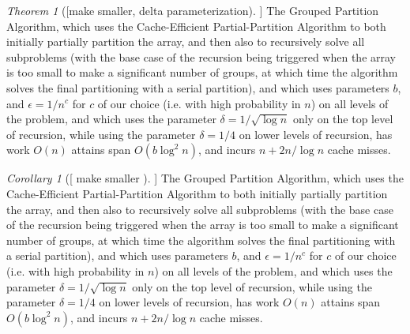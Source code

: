 \documentclass[sigconf]{acmart}
\theoremstyle{remark}
\newtheorem{theorem}{Theorem}[section]
\newtheorem{corollary}[thm]{Corollary}
\theoremstyle{remark}
\begin{document}
\begin{theorem}
	[[make smaller, delta parameterization]]
	The Grouped Partition Algorithm, which uses the Cache-Efficient Partial-Partition Algorithm to both initially partially partition the array, and then also to recursively solve all subproblems (with the base case of the recursion being triggered when the array is too small to make a significant number of groups, at which time the algorithm solves the final partitioning with a serial partition), and which uses parameters $b$, and $\epsilon = 1/n^c$ for $c$ of our choice (i.e. with high probability in $n$) on all levels of the problem, and which uses the parameter $\delta=1/\sqrt{\log n}$ only on the top level of recursion, while using the parameter $\delta=1/4$ on lower levels of recursion, has work $O(n)$ attains span $O(b\log^2 n)$, and incurs $n + 2 n/\log n$ cache misses. %
\end{theorem}
\begin{corollary}
	[[ make smaller ]]
	The Grouped Partition Algorithm, which uses the Cache-Efficient Partial-Partition Algorithm to both initially partially partition the array, and then also to recursively solve all subproblems (with the base case of the recursion being triggered when the array is too small to make a significant number of groups, at which time the algorithm solves the final partitioning with a serial partition), and which uses parameters $b$, and $\epsilon = 1/n^c$ for $c$ of our choice (i.e. with high probability in $n$) on all levels of the problem, and which uses the parameter $\delta=1/\sqrt{\log n}$ only on the top level of recursion, while using the parameter $\delta=1/4$ on lower levels of recursion, has work $O(n)$ attains span $O(b\log^2 n)$, and incurs $n + 2 n/\log n$ cache misses. %
\end{corollary}
\end{document}
